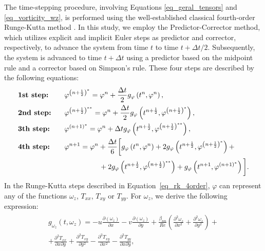 \documentclass[preprint, 12pt]{elsarticle}
\begin{document}
The time-stepping procedure, involving Equations \eqref{eq_geral_tensors} and \eqref{eq_vorticity_wz}, is performed using the well-established classical fourth-order Runge-Kutta method \cite{ferziger2002computational}. In this study, we employ the Predictor-Corrector method, which utilizes explicit and implicit Euler steps as predictor and corrector, respectively, to advance the system from time $t$ to time $t+\Delta t / 2$. Subsequently, the system is advanced to time $t+\Delta t$ using a predictor based on the midpoint rule and a corrector based on Simpson's rule. These four steps are described by the following equations:
\begin{gather}
    \begin{aligned}
        &\textbf{1st step:} & & \hspace{0.3cm}\varphi^{\left(n+\frac{1}{2}\right)^{*}} =\varphi^n+\frac{\Delta t}{2} g_{\varphi}\left(t^n, \varphi^n\right),\\
        &\textbf{2nd step:} & & \hspace{0.3cm}\varphi^{\left(n+\frac{1}{2}\right)^{* *}} =\varphi^n+\frac{\Delta t}{2} g_{\varphi}\left(t^{n+\frac{1}{2}}, \varphi^{\left(n+\frac{1}{2}\right)^*}\right),\\
        &\textbf{3th step:} & & \hspace{0.3cm}\varphi^{(n+1)^*} =\varphi^n+\Delta t g_{\varphi}\left(t^{n+\frac{1}{2}},\varphi^{\left(n+\frac{1}{2}\right)^{* *}}\right),\\
        &\textbf{4th step:} & & \hspace{0.3cm}\varphi^{n+1} = \varphi^n+\frac{\Delta t}{6}\bigg[g_{\varphi}\left(t^n, \varphi^n\right) + 2 g_{\varphi}\left(t^{n+\frac{1}{2}}, \varphi^{\left(n+\frac{1}{2}\right)^{*}}\right) + \\ 
        & & &\hspace{2cm} + 2 g_{\varphi}\left(t^{n+\frac{1}{2}}, \varphi^{\left(n+\frac{1}{2}\right)^{**}}\right)+ g_{\varphi}\left(t^{n+1}, \varphi^{(n+1)^{*}}\right)\bigg].\label{eq_rk_4order}
    \end{aligned}
\end{gather}
In the Runge-Kutta steps described in Equation~\eqref{eq_rk_4order}, $\varphi$
can represent any of the functions $\omega_{z}$, $T_{xx}$, $T_{xy}$ or
$T_{yy}$. For $\omega_{z}$, we derive the following expression:
\begin{gather}
    \begin{aligned}
        g_{\omega_{z}}\left(t, \omega_z\right) = - u\frac{\partial\left(\omega_{z}\right)}{\partial x} - v \frac{\partial\left(\omega_{z}\right)}{\partial y} + \frac{\beta_{nn}}{R e}\left(\frac{\partial^2 \omega_{z}}{\partial x^2} + \frac{\partial^2 \omega_{z}}{\partial y^2}\right) + \\ +  \frac{\partial^2 T_{x x}}{\partial x \partial y} + \frac{\partial^2 T_{x y}}{\partial y^2} - \frac{\partial^2 T_{x y}}{\partial x^2} - \frac{\partial^2 T_{y y}}{\partial x \partial y},
    \end{aligned}
\end{gather}
\end{document}
